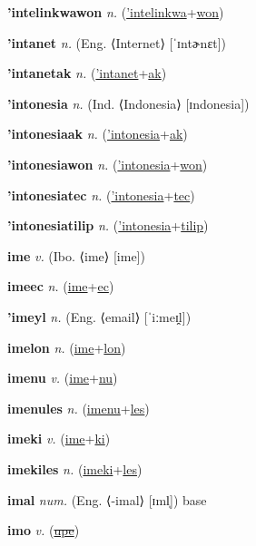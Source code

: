 \textbf{\hypertarget{'intelinkwawon}{'intelinkwawon}} \textit{n.} (\hyperlink{'intelinkwa}{'intelinkwa}+\allowbreak \hyperlink{won}{won})


\textbf{\hypertarget{'intanet}{'intanet}} \textit{n.} (Eng. ⟨Internet⟩ [ˈɪntɚnɛt])


\textbf{\hypertarget{'intanetak}{'intanetak}} \textit{n.} (\hyperlink{'intanet}{'intanet}+\allowbreak \hyperlink{ak}{ak})


\textbf{\hypertarget{'intonesia}{'intonesia}} \textit{n.} (Ind. ⟨Indonesia⟩ [ɪndonesia])


\textbf{\hypertarget{'intonesiaak}{'intonesiaak}} \textit{n.} (\hyperlink{'intonesia}{'intonesia}+\allowbreak \hyperlink{ak}{ak})


\textbf{\hypertarget{'intonesiawon}{'intonesiawon}} \textit{n.} (\hyperlink{'intonesia}{'intonesia}+\allowbreak \hyperlink{won}{won})


\textbf{\hypertarget{'intonesiatec}{'intonesiatec}} \textit{n.} (\hyperlink{'intonesia}{'intonesia}+\allowbreak \hyperlink{tec}{tec})


\textbf{\hypertarget{'intonesiatilip}{'intonesiatilip}} \textit{n.} (\hyperlink{'intonesia}{'intonesia}+\allowbreak \hyperlink{tilip}{tilip})


\textbf{\hypertarget{ime}{ime}} \textit{v.} (Ibo. ⟨ime⟩ [ime])


\textbf{\hypertarget{imeec}{imeec}} \textit{n.} (\hyperlink{ime}{ime}+\allowbreak \hyperlink{ec}{ec})


\textbf{\hypertarget{'imeyl}{'imeyl}} \textit{n.} (Eng. ⟨email⟩ [ˈiːmeɪ̯l])


\textbf{\hypertarget{imelon}{imelon}} \textit{n.} (\hyperlink{ime}{ime}+\allowbreak \hyperlink{lon}{lon})


\textbf{\hypertarget{imenu}{imenu}} \textit{v.} (\hyperlink{ime}{ime}+\allowbreak \hyperlink{nu}{nu})


\textbf{\hypertarget{imenules}{imenules}} \textit{n.} (\hyperlink{imenu}{imenu}+\allowbreak \hyperlink{les}{les})


\textbf{\hypertarget{imeki}{imeki}} \textit{v.} (\hyperlink{ime}{ime}+\allowbreak \hyperlink{ki}{ki})


\textbf{\hypertarget{imekiles}{imekiles}} \textit{n.} (\hyperlink{imeki}{imeki}+\allowbreak \hyperlink{les}{les})


\textbf{\hypertarget{imal}{imal}} \textit{num.} (Eng. ⟨-imal⟩ [ɪml̩])
base

\textbf{\hypertarget{imo}{imo}} \textit{v.} (\hyperlink{upe}{\sout{upe}})



